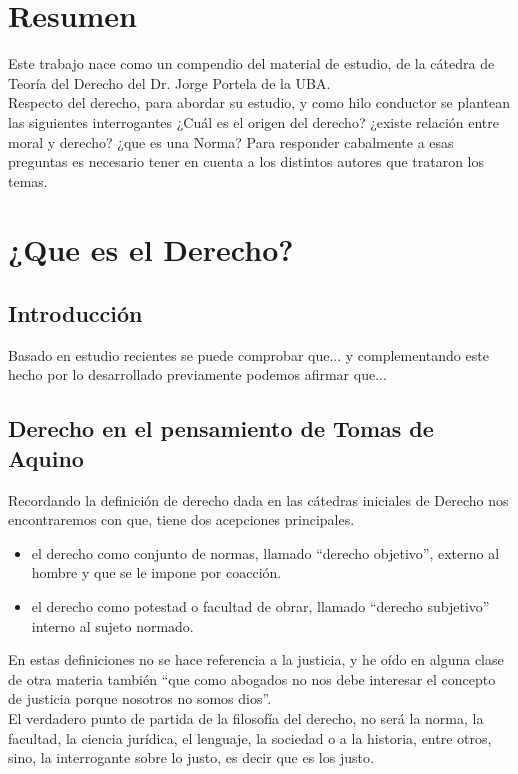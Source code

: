 \documentclass[12pt]{book}
\begin{document}
\tableofcontents
\chapter*{Resumen} %
Este trabajo nace como un compendio del material de estudio, de la cátedra de Teoría del Derecho del Dr. Jorge Portela de la UBA.
\\
Respecto del derecho, para abordar su estudio, y como hilo conductor se plantean las siguientes interrogantes
¿Cuál es el origen del derecho?
¿existe relación entre moral y derecho? 
¿que es una Norma?
Para responder cabalmente a esas preguntas es necesario tener en cuenta a los distintos autores que trataron los temas.


\chapter{¿Que es el Derecho?}

\section{Introducción}

 
Basado en estudio recientes \cite{BERMUDEZ} se puede comprobar que... y 
complementando este hecho por lo desarrollado previamente \cite{Luckie2010} 
podemos afirmar que...
 
\section{Derecho en el pensamiento de Tomas de Aquino \cite{BERMUDEZ}}
Recordando la definición de derecho dada en las cátedras iniciales de Derecho nos encontraremos con que, tiene dos acepciones principales.
\begin{itemize}
\item el derecho como conjunto de normas, llamado “derecho objetivo”, externo al hombre y
que se le impone por coacción.
\item el derecho como potestad o facultad de obrar, llamado “derecho subjetivo” interno al
sujeto normado.
\end{itemize}
En estas definiciones no se hace referencia a la justicia, y he oído en alguna clase de otra
materia también “que como abogados no nos debe interesar el concepto de justicia porque nosotros no somos dios”.
\\
El verdadero punto de partida de la filosofía del derecho, no será la norma, la facultad, la ciencia jurídica, el lenguaje, la
sociedad o a la historia, entre otros, sino, la interrogante sobre lo justo, es decir que es los justo.
\end{document}
